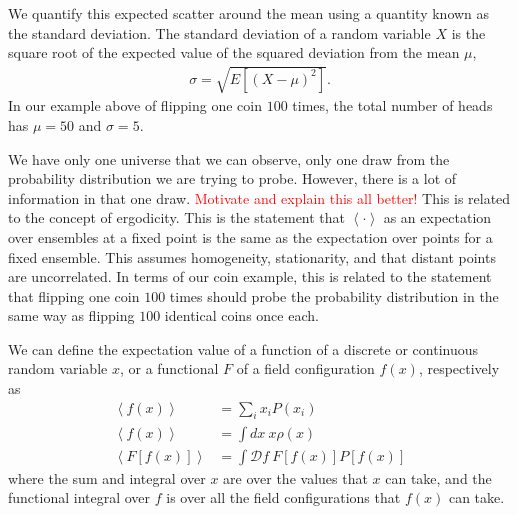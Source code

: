     We quantify this expected scatter around the mean using a quantity known as the standard deviation.
    The standard deviation of a random variable $X$ is the square root of the expected value of the
    squared deviation from the mean $\mu$,
    \begin{align}
        \sigma = \sqrt{E\left[{(X-\mu)}^2\right]}.
    \end{align}
    In our example above of flipping one coin $100$ times, the total number of heads has $\mu=50$
    and $\sigma=5$.

    
    We have only one universe that we can observe, only one draw from the probability distribution
    we are trying to probe. However, there is a lot of information in that one draw.
    \textcolor{red}{Motivate and explain this all better!} This is related to the concept
    of ergodicity. This is the statement that $\left<\cdot\right>$ as an expectation over ensembles
    at a fixed point is the same as the expectation over points for a fixed ensemble.
    This assumes homogeneity, stationarity, and that distant points are uncorrelated.
    In terms of our coin example, this is related to the statement that flipping one coin
    $100$ times should probe the probability distribution in the same way as flipping
    $100$ identical coins once each.


    We can define the expectation value of a function of a discrete or
    continuous random variable $x$, or a functional $F$ of a field configuration $f(x)$, respectively as
    \begin{align}
        \left<f(x)\right> &= \sum_i x_i P(x_i)\label{expectation_value_discrete}\\
        \left<f(x)\right> &= \int dx~x \rho(x)\label{expectation_value_cont}\\
        \left<F\left[f(x)\right]\right> &= \int \mathcal{D}f~F\left[f(x)\right] P\left[f(x)\right]\label{expectation_value_field}
    \end{align}
    where the sum and integral over $x$ are over the values that $x$ can take,
    and the functional integral over $f$ is over all the field configurations
    that $f(x)$ can take.


